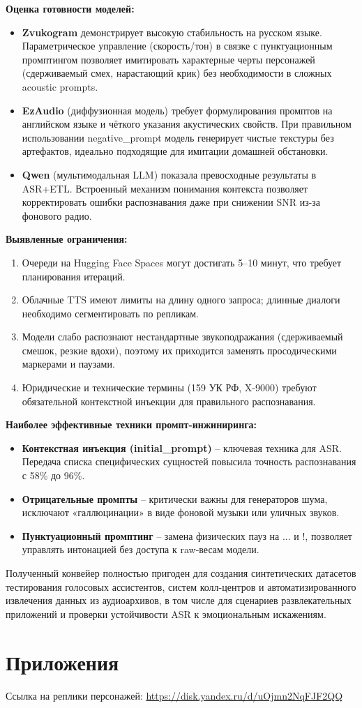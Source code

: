 \documentclass[oneside,a4paper,14pt]{extarticle}
\begin{document}
	\noindent\textbf{Оценка готовности моделей:}
	\begin{itemize}
		\item \textbf{Zvukogram} демонстрирует высокую стабильность на русском языке. Параметрическое управление (скорость/тон) в связке с пунктуационным промптингом позволяет имитировать характерные черты персонажей (сдерживаемый смех, нарастающий крик) без необходимости в сложных acoustic prompts.
		\item \textbf{EzAudio} (диффузионная модель) требует формулирования промптов на английском языке и чёткого указания акустических свойств. При правильном использовании negative\_prompt модель генерирует чистые текстуры без артефактов, идеально подходящие для имитации домашней обстановки.
		\item \textbf{Qwen} (мультимодальная LLM) показала превосходные результаты в ASR+ETL. Встроенный механизм понимания контекста позволяет корректировать ошибки распознавания даже при снижении SNR из-за фонового радио.
	\end{itemize}
	
	\noindent\textbf{Выявленные ограничения:}
	\begin{enumerate}
		\item Очереди на Hugging Face Spaces могут достигать 5–10 минут, что требует планирования итераций.
		\item Облачные TTS имеют лимиты на длину одного запроса; длинные диалоги необходимо сегментировать по репликам.
		\item Модели слабо распознают нестандартные звукоподражания (сдерживаемый смешок, резкие вдохи), поэтому их приходится заменять просодическими маркерами и паузами.
		\item Юридические и технические термины (159 УК РФ, X-9000) требуют обязательной контекстной инъекции для правильного распознавания.
	\end{enumerate}
	
	\noindent\textbf{Наиболее эффективные техники промпт-инжиниринга:}
	\begin{itemize}
		\item \textbf{Контекстная инъекция (initial\_prompt)} -- ключевая техника для ASR. Передача списка специфических сущностей повысила точность распознавания с 58\% до 96\%.
		\item \textbf{Отрицательные промпты} -- критически важны для генераторов шума, исключают «галлюцинации» в виде фоновой музыки или уличных звуков.
		\item \textbf{Пунктуационный промптинг} -- замена физических пауз на ... и !, позволяет управлять интонацией без доступа к raw-весам модели.
	\end{itemize}
	\noindent Полученный конвейер полностью пригоден для создания синтетических датасетов тестирования голосовых ассистентов, систем колл-центров и автоматизированного извлечения данных из аудиоархивов, в том числе для сценариев развлекательных приложений и проверки устойчивости ASR к эмоциональным искажениям.
	
	\section*{Приложения}
	Ссылка на реплики персонажей:
	\url{https://disk.yandex.ru/d/uOjmn2NqFJF2QQ}
\end{document}
